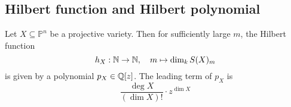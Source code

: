 \subsection{Hilbert function and Hilbert polynomial}
Let $X \subseteq \mathbb{P}^n$ be a projective variety. Then for sufficiently large $m$, the Hilbert function
\begin{equation*}
    h_X: \mathbb{N} \to \mathbb{N}, \quad m \mapsto \dim_k S(X)_m
\end{equation*}
is given by a polynomial $p_X \in \mathbb{Q}[z]$. The leading term of $p_X$ is
\begin{equation*}
    \frac {\deg X} {(\dim X)!} \cdot z^{\dim X}
\end{equation*}
